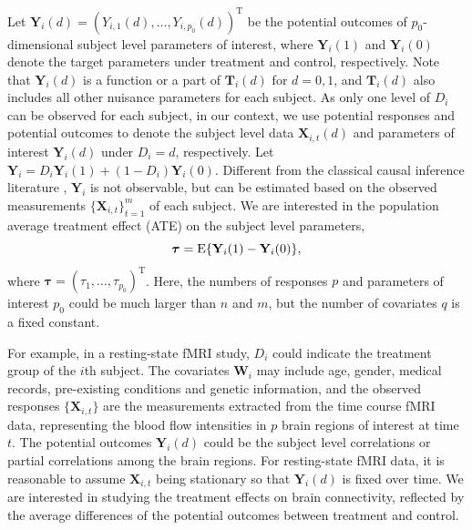 \documentclass[12pt]{article}
\def\be{\begin{equation}}
\def\ee{\end{equation}}
\def\T{{ \mathrm{\scriptscriptstyle T} }}
\theoremstyle{definition}
\newcommand{\E}{\rm E}
\newcommand{\bT}{{\mathbf T}}
\newcommand{\bW}{{\mathbf W}}
\newcommand{\bX}{{\mathbf X}}
\newcommand{\bY}{{\mathbf Y}}
\newcommand{\btau}{\boldsymbol{\tau}}
\begin{document}
Let $\bY_{i}(d) = (Y_{i, 1}(d), \ldots, Y_{i, p_0}(d))^{\T}$ be the potential outcomes of $p_0$-dimensional subject level parameters of interest,
where $\bY_{i}(1)$ and $\bY_{i}(0)$ denote the target parameters under treatment and control, respectively. %
Note that $\bY_{i}(d)$ is a function or a part of $\bT_{i}(d)$ for $d = 0, 1$, and $\bT_{i}(d)$ also includes all other nuisance parameters for each subject. 
As only one level of $D_i$ can be observed for each subject, in our context, we use potential responses and potential outcomes to denote the subject level data $\bX_{i, t}(d)$ and parameters of interest $\bY_{i}(d)$ under $D_i = d$, respectively.
Let $\bY_{i} = D_{i}\bY_{i}(1) + (1 - D_{i})\bY_{i}(0)$.
Different from the classical causal inference literature \citep{rubin1974estimating}, $\bY_{i}$ is not observable, but can be estimated based on the observed measurements $\{\bX_{i, t}\}_{t = 1}^{m}$ of each subject.
We are interested in the population average treatment effect (ATE) on the subject level parameters, 
\be
\btau = {\E}\{\bY_{i}(1) - \bY_{i}(0)\},
\label{eq:parameter}
\ee 
where $\btau = (\tau_{1}, \ldots, \tau_{p_0})^{\T}$. 
Here, the numbers of responses $p$ and parameters of interest $p_0$ could be much larger than $n$ and $m$, but the number of covariates $q$ is a fixed constant.

For example, in a resting-state 
fMRI study, $D_{i}$ could indicate the treatment group 
of the $i$th subject. The covariates $\bW_{i}$ may include age, gender, medical records, pre-existing conditions and genetic information, and the observed responses $\{\bX_{i, t}\}$ are the measurements extracted from the time course fMRI data, representing the blood flow intensities in $p$ brain regions of interest at time $t$. 
The potential outcomes $\bY_{i}(d)$ could be the subject level correlations or partial correlations among the brain regions. 
For resting-state fMRI data, it is reasonable to assume $\bX_{i, t}$ being stationary so that $\bY_{i}(d)$ is fixed over time.
We are interested in studying the treatment effects on brain connectivity, reflected by the average differences of the potential outcomes 
between treatment and control.
\end{document}
